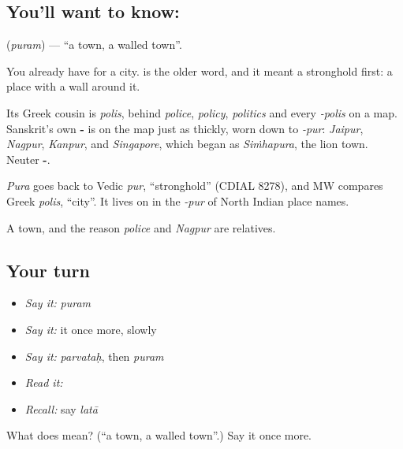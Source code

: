 \subsection*{You'll want to know: }
\textbf{} (\emph{puram}) — \textquotedblleft{}a town, a walled town\textquotedblright{}.

You already have \textbf{} for a city. \textbf{} is the older word, and it meant a stronghold first: a place with a wall around it.

Its Greek cousin is \emph{polis}, behind \emph{police}, \emph{policy}, \emph{politics} and every \emph{-polis} on a map. Sanskrit's own \textbf{-} is on the map just as thickly, worn down to \emph{-pur}: \emph{Jaipur}, \emph{Nagpur}, \emph{Kanpur}, and \emph{Singapore}, which began as \emph{Siṁhapura}, the lion town. Neuter \textbf{-}.

\begin{cousinweb}
\emph{Pura} goes back to Vedic \emph{pur}, \textquotedblleft{}stronghold\textquotedblright{} (CDIAL 8278), and MW compares Greek \emph{polis}, \textquotedblleft{}city\textquotedblright{}. It lives on in the \emph{-pur} of North Indian place names.
\end{cousinweb}

\begin{grammarlens}[title={What you've built}]
A town, and the reason \emph{police} and \emph{Nagpur} are relatives.
\end{grammarlens}

\subsection*{Your turn}
\begin{itemize}
\raggedright
  \item \emph{Say it:} \emph{puram}
  \item \emph{Say it:} it once more, slowly
  \item \emph{Say it:} \emph{parvataḥ}, then \emph{puram}
  \item \emph{Read it:} \textbf{}
  \item \emph{Recall:} say \emph{latā}
\end{itemize}

\begin{tcolorbox}[breakable,colback=teal!4,colframe=teal!35!black,title={Before you move on}]
What does  mean? (\textquotedblleft{}a town, a walled town\textquotedblright{}.) Say it once more.
\end{tcolorbox}
